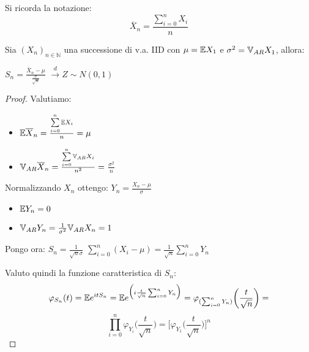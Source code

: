 \vspace{10px}
\noindent
Si ricorda la notazione: \[\overline{X}_n=\frac{\sum\limits_{i=0}^n X_i}{n}\]

\begin{theorem}
Sia $(X_n)_{n\in\mathbb{N}}$ una successione di v.a. IID con $\mu=\mathbb{E} X_1$ e $\sigma^2=\mathbb{V}_{AR} X_1$, allora:
\begin{center}
$S_n=${\large $\frac{\overline{X}_n-\mu}{\frac{\sigma}{\sqrt{n}}}$} $\xrightarrow{d} Z\sim N(0,1)$
\end{center}

\begin{proof}
Valutiamo:
\begin{itemize}
    \item $\mathbb{E} \overline{X}_n = \frac{\sum\limits_{i=0}^n\mathbb{E} X_i}{n}=\mu$
    \item $\mathbb{V}_{AR} \overline{X}_n = \frac{\sum\limits_{i=0}^n\mathbb{V}_{AR} X_i}{n^2} =$ {\Large$ \frac{\sigma^2}{n}$}
\end{itemize}
Normalizzando $X_n$ ottengo: $Y_n=${\large $\frac{X_n-\mu}{\sigma}$}
\begin{itemize}
    \item $\mathbb{E} Y_n = 0$
    \item $\mathbb{V}_{AR} Y_n = \frac{1}{\sigma^2}\mathbb{V}_{AR} X_n = 1$
\end{itemize}
Pongo ora: $S_n=${\large $\frac{1}{\sqrt{n}\sigma}$} $\sum\limits_{i=0}^n(X_i-\mu)=${\large $\frac{1}{\sqrt{n}}$}$\sum\limits_{i=0}^nY_n$
\newline
\noindent

Valuto quindi la funzione caratteristica di $S_n$:
\vspace{10px}
\newline
\[
\varphi_{S_n}(t)=\mathbb{E}{\large e^{itS_n}}=\mathbb{E}{\large e^{\big(i\frac{t}{\sqrt{n}}\sum_{i=0}^nY_n\big)}}=\varphi_{(\sum_{i=0}^nY_n)}\bigg(\frac{t}{\sqrt{n}}\bigg)=\]
\begin{equation}
\label{eq_3}
\prod\limits_{i=0}^n\varphi_{Y_i}\bigg(\frac{t}{\sqrt{n}}\bigg)=\bigg[\varphi_{Y_1}\Big(\frac{t}{\sqrt{n}}\Big)\bigg]^n    
\end{equation}

\vspace{10px}


\end{proof}
\end{theorem}
